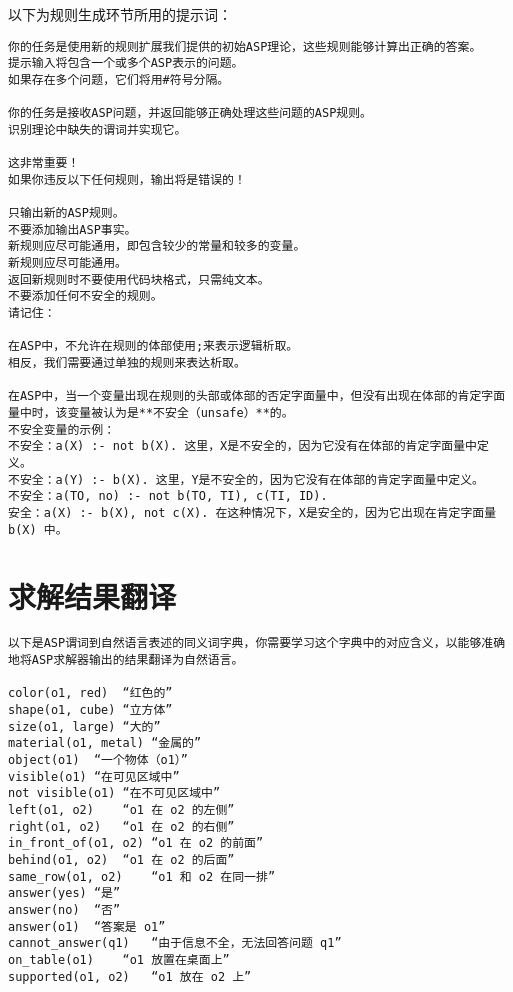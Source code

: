 以下为规则生成环节所用的提示词：
\begin{lstlisting}
你的任务是使用新的规则扩展我们提供的初始ASP理论，这些规则能够计算出正确的答案。
提示输入将包含一个或多个ASP表示的问题。
如果存在多个问题，它们将用#符号分隔。

你的任务是接收ASP问题，并返回能够正确处理这些问题的ASP规则。
识别理论中缺失的谓词并实现它。

这非常重要！
如果你违反以下任何规则，输出将是错误的！

只输出新的ASP规则。
不要添加输出ASP事实。
新规则应尽可能通用，即包含较少的常量和较多的变量。
新规则应尽可能通用。
返回新规则时不要使用代码块格式，只需纯文本。
不要添加任何不安全的规则。
请记住：

在ASP中，不允许在规则的体部使用;来表示逻辑析取。
相反，我们需要通过单独的规则来表达析取。

在ASP中，当一个变量出现在规则的头部或体部的否定字面量中，但没有出现在体部的肯定字面量中时，该变量被认为是**不安全（unsafe）**的。
不安全变量的示例：
不安全：a(X) :- not b(X). 这里，X是不安全的，因为它没有在体部的肯定字面量中定义。
不安全：a(Y) :- b(X). 这里，Y是不安全的，因为它没有在体部的肯定字面量中定义。
不安全：a(TO, no) :- not b(TO, TI), c(TI, ID).
安全：a(X) :- b(X), not c(X). 在这种情况下，X是安全的，因为它出现在肯定字面量 b(X) 中。
\end{lstlisting}
\section{求解结果翻译}
\label{appendix:result-translate}
\begin{lstlisting}
以下是ASP谓词到自然语言表述的同义词字典，你需要学习这个字典中的对应含义，以能够准确地将ASP求解器输出的结果翻译为自然语言。

color(o1, red)	“红色的”
shape(o1, cube)	“立方体”
size(o1, large)	“大的”
material(o1, metal)	“金属的”
object(o1)	“一个物体（o1）”
visible(o1)	“在可见区域中”
not visible(o1)	“在不可见区域中”
left(o1, o2)	“o1 在 o2 的左侧”
right(o1, o2)	“o1 在 o2 的右侧”
in_front_of(o1, o2)	“o1 在 o2 的前面”
behind(o1, o2)	“o1 在 o2 的后面”
same_row(o1, o2)	“o1 和 o2 在同一排”
answer(yes)	“是”
answer(no)	“否”
answer(o1)	“答案是 o1”
cannot_answer(q1)	“由于信息不全，无法回答问题 q1”
on_table(o1)	“o1 放置在桌面上”
supported(o1, o2)	“o1 放在 o2 上”
\end{lstlisting}